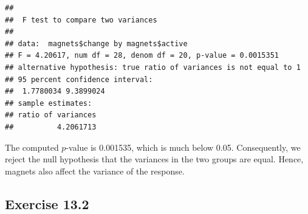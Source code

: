 \documentclass[]{krantz}
\makeatletter
\newenvironment{Shaded}{\begin{snugshade}}{\end{snugshade}}
\newcommand{\KeywordTok}[1]{\textcolor[rgb]{0.13,0.29,0.53}{\textbf{#1}}}
\newcommand{\NormalTok}[1]{#1}
\newcommand{\OperatorTok}[1]{\textcolor[rgb]{0.81,0.36,0.00}{\textbf{#1}}}
\newcommand{\StringTok}[1]{\textcolor[rgb]{0.31,0.60,0.02}{#1}}
\newenvironment{kframe}{%
\medskip{}
\setlength{\fboxsep}{.8em}
 \def\at@end@of@kframe{}%
 \ifinner\ifhmode%
  \def\at@end@of@kframe{\end{minipage}}%
  \begin{minipage}{\columnwidth}%
 \fi\fi%
 \def\FrameCommand##1{\hskip\@totalleftmargin \hskip-\fboxsep
 \colorbox{shadecolor}{##1}\hskip-\fboxsep
     \hskip-\linewidth \hskip-\@totalleftmargin \hskip\columnwidth}%
 \MakeFramed {\advance\hsize-\width
   \@totalleftmargin\z@ \linewidth\hsize
   \@setminipage}}%
 {\par\unskip\endMakeFramed%
 \at@end@of@kframe}
\renewenvironment{Shaded}{\begin{kframe}}{\end{kframe}}
\theoremstyle{definition}
\theoremstyle{definition}
\theoremstyle{definition}
\theoremstyle{remark}
\makeatother
\begin{document}
\begin{enumerate}
\begin{Shaded}
\end{Shaded}

\begin{verbatim}
## 
##  F test to compare two variances
## 
## data:  magnets$change by magnets$active
## F = 4.20617, num df = 28, denom df = 20, p-value = 0.0015351
## alternative hypothesis: true ratio of variances is not equal to 1
## 95 percent confidence interval:
##  1.7780034 9.3899024
## sample estimates:
## ratio of variances 
##          4.2061713
\end{verbatim}

  The computed \(p\)-value is 0.001535, which is much below 0.05.
  Consequently, we reject the null hypothesis that the variances in the
  two groups are equal. Hence, magnets also affect the variance of the
  response.
\end{enumerate}

\hypertarget{exercise-13.2}{%
\subsection*{Exercise 13.2}\label{exercise-13.2}}
\end{document}
